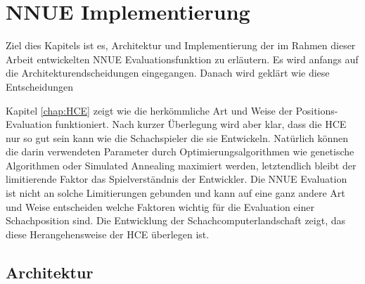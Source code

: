 \chapter{NNUE Implementierung}

Ziel dies Kapitels ist es, Architektur und Implementierung der im Rahmen dieser Arbeit entwickelten \ac{NNUE} Evaluationsfunktion zu erläutern. Es wird anfangs auf die Architekturendscheidungen eingegangen. Danach wird geklärt wie diese Entscheidungen

Kapitel \autoref{chap:HCE} zeigt wie die herkömmliche Art und Weise der Positions-Evaluation funktioniert. Nach kurzer Überlegung wird aber klar, dass die \ac{HCE} nur so gut sein kann wie die Schachspieler die sie Entwickeln. Natürlich können die darin verwendeten Parameter durch Optimierungsalgorithmen wie genetische Algorithmen oder Simulated Annealing maximiert werden, letztendlich bleibt der limitierende Faktor das Spielverständnis der Entwickler. Die \ac{NNUE} Evaluation ist nicht an solche Limitierungen gebunden und kann auf eine ganz andere Art und Weise entscheiden welche Faktoren wichtig für die Evaluation einer Schachposition sind. Die Entwicklung der Schachcomputerlandschaft zeigt, das diese Herangehensweise der \ac{HCE} überlegen ist.


\section{Architektur}

